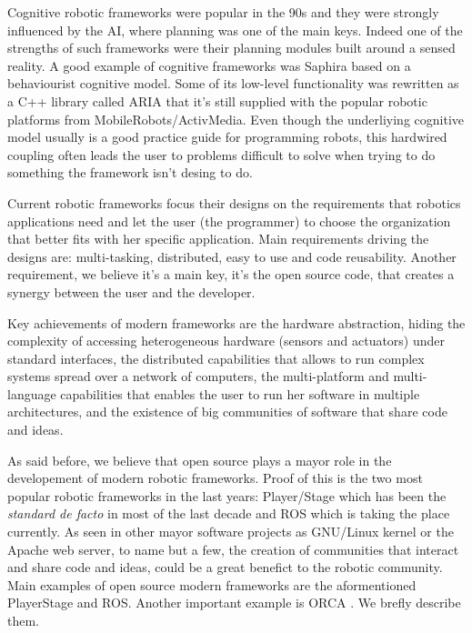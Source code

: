 \documentclass[twocolumn]{svjour3}          %
\begin{document}
Cognitive robotic frameworks were popular in the 90s and they were
strongly influenced by the AI, where planning was one of the main
keys. Indeed one of the strengths of such frameworks were their
planning modules built around a sensed reality. A good example of cognitive
frameworks was Saphira \cite{konolige98} based on a behaviourist
cognitive model. Some of its low-level functionality was rewritten as a
C++ library called ARIA \cite{aria} that it's still supplied with the
popular robotic platforms from MobileRobots/ActivMedia. Even though
the underliying cognitive model usually is a good practice guide for
programming robots, this hardwired coupling often leads the user to
problems difficult to solve when trying to do something the framework
isn't desing to do.

Current robotic frameworks focus their designs on the requirements
that robotics applications need and let the user (the programmer) to
choose the organization that better fits with her specific
application. Main requirements driving the designs are: multi-tasking, distributed, easy to
use and code reusability. Another requirement, we believe it's a main
key, it's the open source code, that creates a synergy between the user
and the developer. 

Key achievements of modern frameworks are the hardware abstraction, hiding the complexity of accessing heterogeneous hardware (sensors and
actuators) under standard interfaces, the distributed capabilities
that allows to run complex systems spread over a network of computers,
the multi-platform and multi-language capabilities that enables the
user to run her software in multiple architectures, and the existence
of big communities of software that share code and ideas.

As said before, we believe that open source plays a mayor role in the
developement of modern robotic frameworks. Proof of this is the two most popular robotic
frameworks in the last years: Player/Stage
\cite{Gerkey03,collet05,vaughan2007} which has been the \textit{standard de
facto} in most of the last decade and ROS \cite{quigley09} which is
taking the place currently. As seen in other mayor software projects
as GNU/Linux kernel or the Apache web server, to name but a few, the
creation of communities that interact and share code and ideas, could
be a great benefict to the robotic community. Main examples of open
source modern frameworks are the aformentioned PlayerStage and
ROS. Another important example is ORCA \cite{brooks05,brooks07}. We
brefly describe them.
\end{document}
